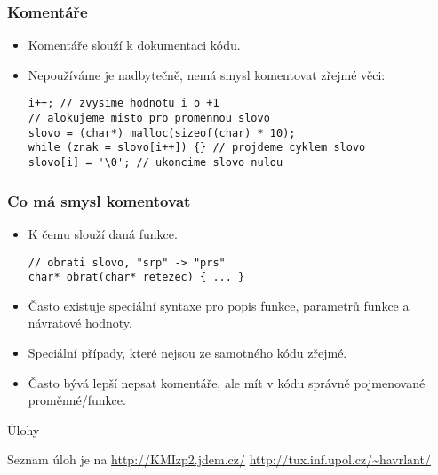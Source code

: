 \documentclass{beamer}
\newenvironment{itemizex}%
  {\large \begin{itemize}%
    \setlength{\itemsep}{8pt}%
    \setlength{\parskip}{8pt}}%
  {\end{itemize}}
\begin{document}
\begin{frame}[t,fragile]\frametitle{Komentáře} 
    \begin{itemizex}
        \item Komentáře slouží k dokumentaci kódu.
        \item Nepoužíváme je nadbytečně, nemá smysl komentovat zřejmé věci:
\begin{verbatim} 
i++; // zvysime hodnotu i o +1
// alokujeme misto pro promennou slovo
slovo = (char*) malloc(sizeof(char) * 10);
while (znak = slovo[i++]) {} // projdeme cyklem slovo
slovo[i] = '\0'; // ukoncime slovo nulou
\end{verbatim}
    \end{itemizex}
\end{frame}


\begin{frame}[t,fragile]\frametitle{Co má smysl komentovat} 
    \begin{itemizex}
        \item K čemu slouží daná funkce. 
\begin{verbatim} 
// obrati slovo, "srp" -> "prs"
char* obrat(char* retezec) { ... }
\end{verbatim}
        \item Často existuje speciální syntaxe pro popis funkce, parametrů funkce a návratové hodnoty. 
        \item Speciální případy, které nejsou ze samotného kódu zřejmé.
        \item Často bývá lepší nepsat komentáře, ale mít v kódu správně pojmenované proměnné/funkce. 
    \end{itemizex}
\end{frame}

\begin{frame}[t,fragile]{Úlohy}
\begin{center}
\vskip 1cm
{\Large Seznam úloh je na \url{http://KMIzp2.jdem.cz/}}
\vskip 2cm
\url{http://tux.inf.upol.cz/~havrlant/}
\end{center}
\end{frame}
\end{document}
